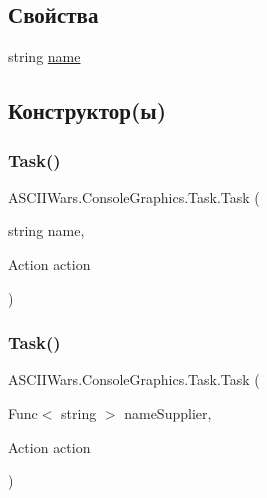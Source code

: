 \subsection*{Свойства}
\begin{DoxyCompactItemize}
\item 
string \hyperlink{class_a_s_c_i_i_wars_1_1_console_graphics_1_1_task_a235e892a10d43807b743c0edf8855df3}{name}
\end{DoxyCompactItemize}


\subsection{Конструктор(ы)}
\hypertarget{class_a_s_c_i_i_wars_1_1_console_graphics_1_1_task_a2fe2e33110134ec07ed7ad5960976c6a}{}\label{class_a_s_c_i_i_wars_1_1_console_graphics_1_1_task_a2fe2e33110134ec07ed7ad5960976c6a} 
\subsubsection{\texorpdfstring{Task()}{Task()}\hspace{0.1cm}{\footnotesize\ttfamily [1/2]}}
{\footnotesize\ttfamily A\+S\+C\+I\+I\+Wars.\+Console\+Graphics.\+Task.\+Task (\begin{DoxyParamCaption}\item[{string}]{name,  }\item[{Action}]{action }\end{DoxyParamCaption})\hspace{0.3cm}{\ttfamily [inline]}}

\hypertarget{class_a_s_c_i_i_wars_1_1_console_graphics_1_1_task_a083e89927241325952a8790824b79f83}{}\label{class_a_s_c_i_i_wars_1_1_console_graphics_1_1_task_a083e89927241325952a8790824b79f83} 
\subsubsection{\texorpdfstring{Task()}{Task()}\hspace{0.1cm}{\footnotesize\ttfamily [2/2]}}
{\footnotesize\ttfamily A\+S\+C\+I\+I\+Wars.\+Console\+Graphics.\+Task.\+Task (\begin{DoxyParamCaption}\item[{Func$<$ string $>$}]{name\+Supplier,  }\item[{Action}]{action }\end{DoxyParamCaption})\hspace{0.3cm}{\ttfamily [inline]}}




